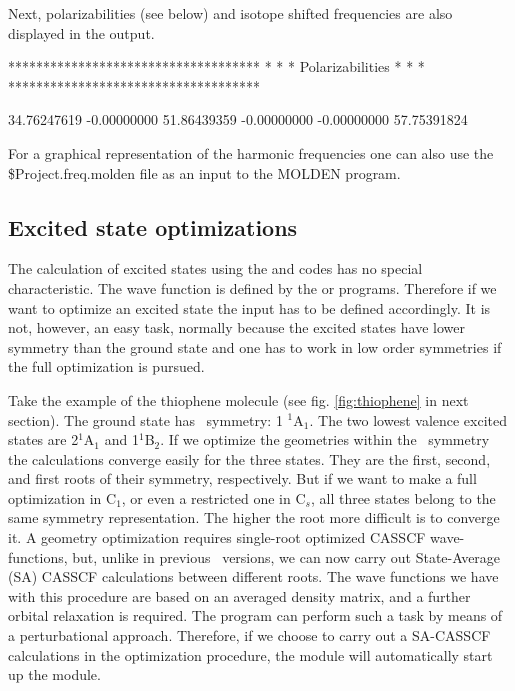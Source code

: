 Next, polarizabilities (see below) and isotope shifted frequencies are also displayed
in the output.

\begin{inputlisting}
 ************************************
 *                                  *
 *       Polarizabilities           *
 *                                  *
 ************************************



   34.76247619
   -0.00000000 51.86439359
   -0.00000000 -0.00000000 57.75391824
\end{inputlisting}

For a graphical representation of the harmonic frequencies one can also use the
\$Project.freq.molden file as an input to the MOLDEN program.

\subsection{Excited state optimizations}


The calculation of excited states using the  and  codes
has no special characteristic. The wave function is defined by the
 or  programs. Therefore if we want to optimize an excited
state the  input has to be defined accordingly. It is not, 
however, an easy task, normally because the excited states have lower
symmetry than the ground state and one has to work in low order
symmetries if the full optimization is pursued. 


Take the example of the thiophene molecule (see fig. \ref{fig:thiophene}
in next section). The ground state has 
\Ctv\ symmetry: 1 $^1$A$_1$. The two lowest valence excited states
are 2$^1$A$_1$ and 1$^1$B$_2$. If we optimize the geometries within
the \Ctv\ symmetry the calculations converge easily for the three
states. They are the first, second, and first roots of their
symmetry, respectively. But if we want to make a full optimization
in C$_1$, or even a restricted one in C$_s$, all three states belong
to the same symmetry representation. The higher the root more
difficult is to converge it. A geometry optimization requires
single-root optimized CASSCF wave-functions, but, unlike in previous \molcas\
versions, we can now carry out State-Average (SA) CASSCF calculations
between different roots. The wave functions we have with this procedure
are based on an averaged density matrix, and a further orbital relaxation
is required. The \program{MCLR} program can perform such a task by means
of a perturbational approach. Therefore, if we choose to carry out a
SA-CASSCF calculations in the optimization procedure, the 
module will automatically start up the \program{MCLR} module.

